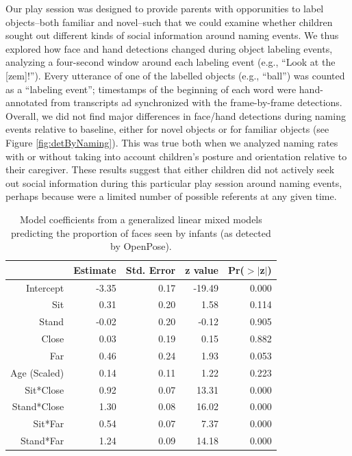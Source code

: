 \documentclass[english,man]{apa6}
\begin{document}
Our play session was designed to provide parents with opporunities to
label objects--both familiar and novel--such that we could examine
whether children sought out different kinds of social information around
naming events. We thus explored how face and hand detections changed
during object labeling events, analyzing a four-second window around
each labeling event (e.g., \enquote{Look at the {[}zem{]}!}). Every
utterance of one of the labelled objects (e.g., \enquote{ball}) was
counted as a \enquote{labeling event}; timestamps of the beginning of
each word were hand-annotated from transcripts ad synchronized with the
frame-by-frame detections. Overall, we did not find major differences in
face/hand detections during naming events relative to baseline, either
for novel objects or for familiar objects (see Figure
\ref{fig:detByNaming}). This was true both when we analyzed naming rates
with or without taking into account children's posture and orientation
relative to their caregiver. These results suggest that either children
did not actively seek out social information during this particular play
session around naming events, perhaps because were a limited number of
possible referents at any given time.

\begin{table}[ht]
\centering
\begin{tabular}{rrrrr}
  \hline
 & Estimate & Std. Error & z value & Pr($>$$|$z$|$) \\
  \hline
Intercept & -3.35 & 0.17 & -19.49 & 0.000 \\
  Sit & 0.31 & 0.20 & 1.58 & 0.114 \\
  Stand & -0.02 & 0.20 & -0.12 & 0.905 \\
  Close & 0.03 & 0.19 & 0.15 & 0.882 \\
  Far & 0.46 & 0.24 & 1.93 & 0.053 \\
  Age (Scaled) & 0.14 & 0.11 & 1.22 & 0.223 \\
  Sit*Close & 0.92 & 0.07 & 13.31 & 0.000 \\
  Stand*Close & 1.30 & 0.08 & 16.02 & 0.000 \\
  Sit*Far & 0.54 & 0.07 & 7.37 & 0.000 \\
  Stand*Far & 1.24 & 0.09 & 14.18 & 0.000 \\
   \hline
\end{tabular}
\caption{Model coefficients from a generalized linear mixed models predicting the proportion of faces seen by infants (as detected by OpenPose).}
\end{table}
\end{document}
